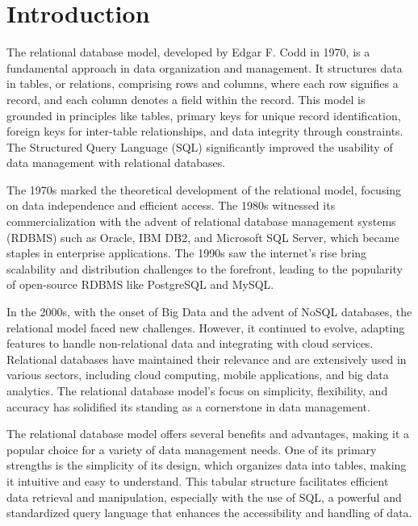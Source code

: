 %
%

\section{Introduction}

The relational database model, developed by Edgar F. Codd in 1970, is a fundamental approach in data organization and management. It structures data in tables, or relations, comprising rows and columns, where each row signifies a record, and each column denotes a field within the record. This model is grounded in principles like tables, primary keys for unique record identification, foreign keys for inter-table relationships, and data integrity through constraints. The Structured Query Language (SQL) significantly improved the usability of data management with relational databases.

The 1970s marked the theoretical development of the relational model, focusing on data independence and efficient access. The 1980s witnessed its commercialization with the advent of relational database management systems (RDBMS) such as Oracle, IBM DB2, and Microsoft SQL Server, which became staples in enterprise applications. The 1990s saw the internet's rise bring scalability and distribution challenges to the forefront, leading to the popularity of open-source RDBMS like PostgreSQL and MySQL.

In the 2000s, with the onset of Big Data and the advent of NoSQL databases, the relational model faced new challenges. However, it continued to evolve, adapting features to handle non-relational data and integrating with cloud services. Relational databases have maintained their relevance and are extensively used in various sectors, including cloud computing, mobile applications, and big data analytics. The relational database model's focus on simplicity, flexibility, and accuracy has solidified its standing as a cornerstone in data management.

The relational database model offers several benefits and advantages, making it a popular choice for a variety of data management needs. One of its primary strengths is the simplicity of its design, which organizes data into tables, making it intuitive and easy to understand. This tabular structure facilitates efficient data retrieval and manipulation, especially with the use of SQL, a powerful and standardized query language that enhances the accessibility and handling of data.

